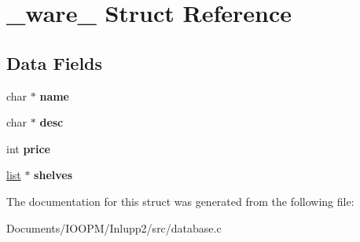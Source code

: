 \hypertarget{struct__ware__}{}\section{\+\_\+ware\+\_\+ Struct Reference}
\label{struct__ware__}
\subsection*{Data Fields}
\begin{DoxyCompactItemize}
\item 
\hypertarget{struct__ware___a5ac083a645d964373f022d03df4849c8}{}char $\ast$ {\bfseries name}\label{struct__ware___a5ac083a645d964373f022d03df4849c8}

\item 
\hypertarget{struct__ware___a3aad16fd4bea1b9717f232ea75ad6449}{}char $\ast$ {\bfseries desc}\label{struct__ware___a3aad16fd4bea1b9717f232ea75ad6449}

\item 
\hypertarget{struct__ware___aef7c2446a93a7dc07f65981daf37fa65}{}int {\bfseries price}\label{struct__ware___aef7c2446a93a7dc07f65981daf37fa65}

\item 
\hypertarget{struct__ware___a37ee6cf25bdd3f2b3d456764e1bdc148}{}\hyperlink{struct__list__}{list} $\ast$ {\bfseries shelves}\label{struct__ware___a37ee6cf25bdd3f2b3d456764e1bdc148}

\end{DoxyCompactItemize}


The documentation for this struct was generated from the following file\+:\begin{DoxyCompactItemize}
\item 
Documents/\+I\+O\+O\+P\+M/\+Inlupp2/src/database.\+c\end{DoxyCompactItemize}
